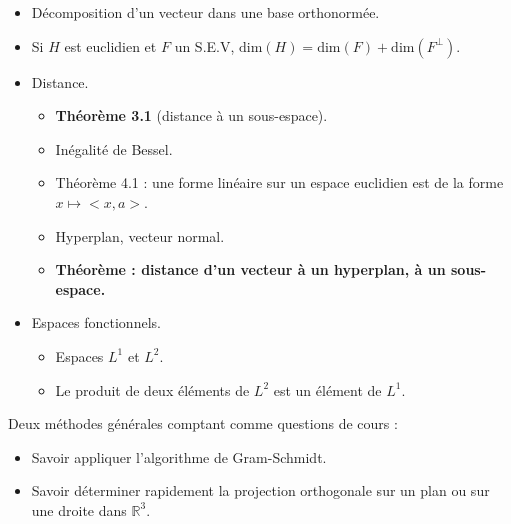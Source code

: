 \documentclass[twoside,a4paper,french,10pt]{VcCours}
\begin{document}
\begin{enumerate}
\begin{itemize}
  \item Décomposition d'un vecteur dans une base orthonormée.
  \item Si $H$ est euclidien et $F$ un S.E.V, $ \textrm{dim}(H) = \textrm{dim}(F) + \textrm{dim}(F^{\perp})$.
  \item Distance.
  \begin{itemize}
  \item \textbf{Théorème 3.1} (distance à un sous-espace).
  \item Inégalité de Bessel.
  \item Théorème 4.1 : une forme linéaire sur un espace euclidien est de la forme $x \mapsto <x,a>$.
  \item Hyperplan, vecteur normal.
  \item \textbf{Théorème : distance d'un vecteur à un hyperplan, à un sous-espace.}
  \end{itemize}
  \item Espaces fonctionnels.
  \begin{itemize}
  \item Espaces $L^1$ et $L^2$.
  \item Le produit de deux éléments de $L^2$ est un élément de $L^1$.
  \end{itemize}
  \end{itemize}
  \end{enumerate}
  
  Deux méthodes générales comptant comme questions de cours :
  \begin{itemize}
  \item Savoir appliquer l'algorithme de Gram-Schmidt.
  \item Savoir déterminer rapidement la projection orthogonale sur un plan ou sur une droite dans $\mathbb{R}^3$.
  \end{itemize}
\end{document}
